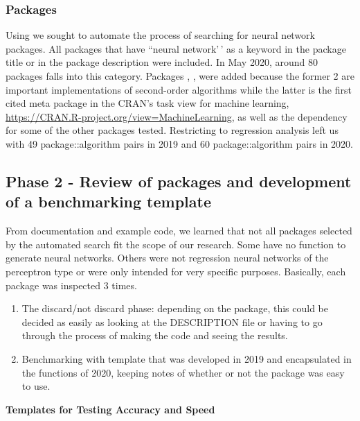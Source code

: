 \hypertarget{packages}{%
\subsubsection{Packages}\label{packages}}

Using  \citep{R-RWsearch} we sought to automate the
process of searching for neural network packages. All packages that have
``neural network'\,' as a keyword in the package title or in the package
description were included. In May 2020, around 80 packages falls into
this category. Packages , ,  were
added because the former 2 are important implementations of second-order
algorithms while the latter is the first cited meta package in the
CRAN's task view for machine learning,
\url{https://CRAN.R-project.org/view=MachineLearning}, as well as the
dependency for some of the other packages tested. Restricting to
regression analysis left us with 49 package::algorithm pairs in 2019 and
60 package::algorithm pairs in 2020.

\hypertarget{phase-2---review-of-packages-and-development-of-a-benchmarking-template}{%
\subsection{Phase 2 - Review of packages and development of a
benchmarking
template}\label{phase-2---review-of-packages-and-development-of-a-benchmarking-template}}

From documentation and example code, we learned that not all packages
selected by the automated search fit the scope of our research. Some
have no function to generate neural networks. Others were not regression
neural networks of the perceptron type or were only intended for very
specific purposes. Basically, each package was inspected 3 times.

\begin{enumerate}
\def\labelenumi{\arabic{enumi}.}
\item
  The discard/not discard phase: depending on the package, this could be
  decided as easily as looking at the DESCRIPTION file or having to go
  through the process of making the code and seeing the results.
\item
  Benchmarking with template that was developed in 2019 and encapsulated
  in the functions of 2020, keeping notes of whether or not the package
  was easy to use.
\end{enumerate}

\textbf{Templates for Testing Accuracy and Speed}

